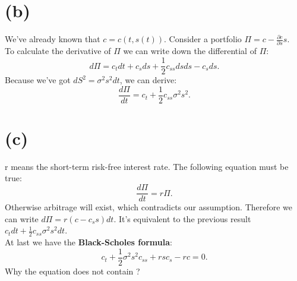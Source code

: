 \documentclass[12pt,a4paper]{paper}
\begin{document}
\section{(b)}
\indent We've already known that $c = c(t, s(t))$. Consider a portfolio $\Pi=c-\frac{\partial c}{\partial s}s$.\\
\indent To calculate the derivative of $\Pi$ we can write down the differential of $\Pi$:
\begin{equation}
d\Pi = c_t dt + c_s ds + \frac{1}{2}c_{ss} ds ds - c_s ds.
\end{equation}
\indent Because we've got $dS^2={\sigma}^{2} s^{2}dt$, we can derive:
\begin{equation}
\frac{d\Pi}{dt}= c_t + \frac{1}{2} c_{ss} \sigma^2 s^2.
\end{equation}

\section{(c)}
\indent r means the short-term risk-free interest rate. The following equation must be true:
\begin{equation}
\frac{d\Pi}{dt}=r\Pi.
\end{equation}
\indent Otherwise arbitrage will exist, which contradicts our assumption. Therefore we can write $d\Pi = r(c - c_s s)dt$. It's equivalent to the previous result $c_t dt + \frac{1}{2} c_{ss} \sigma^2 s^2 dt$.\\
\indent At last we have the \textbf{Black-Scholes formula}:
\begin{equation}
c_t + \frac{1}{2}\sigma^2 s^2 c_{ss} + rsc_s - rc = 0.
\end{equation}
\indent Why the equation does not contain \phi?
\end{document}

